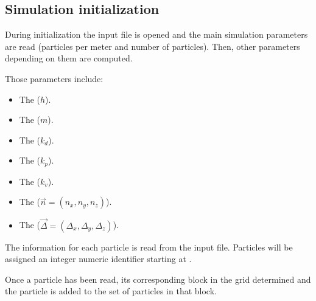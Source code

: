 \subsection{Simulation initialization}

During initialization the input file is opened and the main simulation
parameters are read (particles per meter and number of particles).
Then, other parameters depending on them are computed.

Those parameters include:
\begin{itemize}
\item The  ($h$).
\item The  ($m$).
\item The  ($k_d$).
\item The  ($k_p$).
\item The  ($k_v$).
\item The  ($\vec{n} = (n_x, n_y, n_z)$).
\item The  ($\vec{\Delta} = (\Delta_x, \Delta_y,
\Delta_z)$).
\end{itemize}

The information for each particle is read from the input file. Particles will be
assigned an integer numeric identifier starting at .

Once a particle has been read, its corresponding block in the grid determined
and the particle is added to the set of particles in that block. 
